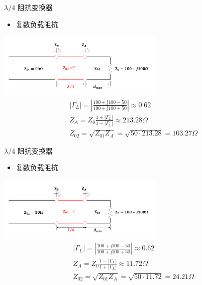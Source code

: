 \begin{frame}{$\lambda/4$ 阻抗变换器}
  \begin{itemize}
    \item 复数负载阻抗
  \end{itemize}
  \centering
  \includegraphics[width=8cm]{Cha4//fig4-29.pdf}
  \begin{align*}
     & \lvert \Gamma_L \rvert = \left\lvert \frac{100+\mathrm{j}100-50}{100+\mathrm{j}100+50}\right\rvert \approx 0.62 \\
     & Z_A=Z_0 \frac{1+\lvert \Gamma_L\rvert}{1-\lvert \Gamma_L\rvert}\approx 213.28\Omega \\
     & Z_{02}=\sqrt{Z_{01}Z_A}=\sqrt{50\cdot 213.28}=103.27\Omega
  \end{align*}
\end{frame}

\begin{frame}{$\lambda/4$ 阻抗变换器}
  \begin{itemize}
    \item 复数负载阻抗
  \end{itemize}
  \centering
  \includegraphics[width=8cm]{Cha4//fig4-30.pdf}
  \begin{align*}
     & \lvert \Gamma_L \rvert = \left\lvert \frac{100+\mathrm{j}100-50}{100+\mathrm{j}100+50}\right\rvert \approx 0.62 \\
     & Z_A=Z_0 \frac{1-\lvert \Gamma_L\rvert}{1+\lvert \Gamma_L\rvert}\approx 11.72\Omega \\
     & Z_{02}=\sqrt{Z_{01}Z_A}=\sqrt{50\cdot 11.72}=24.21\Omega
  \end{align*}
\end{frame}

